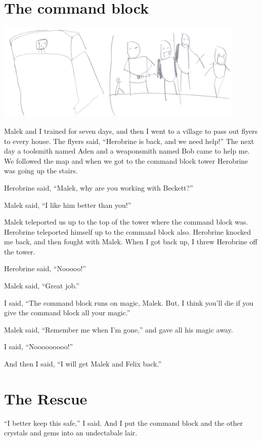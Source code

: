 \documentclass[letterpaper, oneside, 12pt]{krantz}
\begin{document}
\hypertarget{the-command-block}{%
\section{The command block}\label{the-command-block}}

\includegraphics[width=4.6875in,height=\textheight]{img/final-war/nooooo.jpg}

Malek and I trained for seven days, and then I went to a village to pass
out flyers to every house. The flyers said, ``Herobrine is back, and we
need help!'' The next day a toolsmith named Aden and a weaponsmith named
Bob came to help me. We followed the map and when we got to the command
block tower Herobrine was going up the stairs.

Herobrine said, ``Malek, why are you working with Beckett?''

Malek said, ``I like him better than you!''

Malek teleported us up to the top of the tower where the command block
was. Herobrine teleported himself up to the command block also.
Herobrine knocked me back, and then fought with Malek. When I got back
up, I threw Herobrine off the tower.

Herobrine said, ``Nooooo!''

Malek said, ``Great job.''

I said, ``The command block runs on magic, Malek. But, I think you'll
die if you give the command block all your magic.''

Malek said, ``Remember me when I'm gone,'' and gave all his magic away.

I said, ``Nooooooooo!''

And then I said, ``I will get Malek and Felix back.''

\hypertarget{the-rescue}{%
\section{The Rescue}\label{the-rescue}}

``I better keep this safe,'' I said. And I put the command block and the
other crystals and gems into an undectabale lair.
\end{document}
